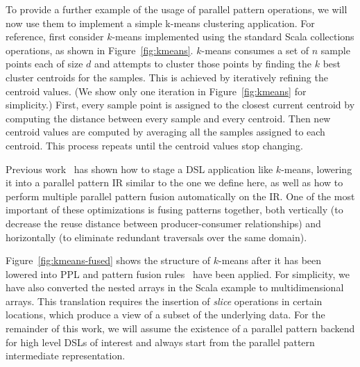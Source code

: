 To provide a further example of the usage of parallel pattern operations, we will now use them to
implement a simple k-means clustering application.
For reference, first consider $k$-means implemented using the standard Scala
collections operations, as shown in Figure~\ref{fig:kmeans}.
$k$-means consumes a set of $n$ sample points each of size $d$ and
attempts to cluster those points by finding the $k$ best cluster centroids for the samples.
This is achieved by iteratively refining the centroid values.
(We show only one iteration in Figure~\ref{fig:kmeans} for simplicity.)
First, every sample point is assigned to the closest current centroid by
computing the distance between every sample and every centroid.
Then new centroid values are computed by averaging all the samples assigned to each centroid.
This process repeats until the centroid values stop changing.

Previous work~\cite{rompf12optimizing,brown16clusters,chambers10flumejava} has shown how to stage a DSL application like $k$-means, lowering it into a parallel pattern IR similar to the one we define here, as well as how to perform multiple parallel pattern fusion automatically on the IR.
One of the most important of these optimizations is fusing patterns together, both vertically (to decrease the reuse distance between producer-consumer relationships) and horizontally (to eliminate redundant traversals over the same domain).

Figure~\ref{fig:kmeans-fused} shows the structure of $k$-means after it has been lowered into PPL and
pattern fusion rules~\cite{rompf12optimizing} have been applied.
For simplicity, we have also converted the nested arrays in the Scala example to multidimensional arrays.
This translation requires the insertion of \emph{slice} operations in certain locations, which produce a view of a subset of the underlying data.
For the remainder of this work, we will assume the existence of a parallel pattern backend
for high level DSLs of interest and always start from the parallel pattern intermediate representation.

%

